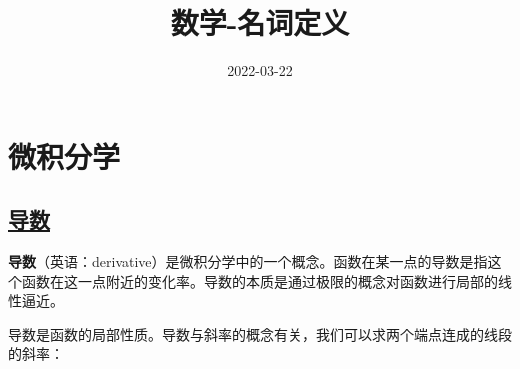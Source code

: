 

\title{数学-名词定义}
\date{2022-03-22}


\maketitle

\section{微积分学}

\subsection{\href{https://zh.wikipedia.org/wiki/\%E5\%AF\%BC\%E6\%95\%B0}{导数}}
\textbf{导数}（英语：derivative）是微积分学中的一个概念。函数在某一点的导数是指这个函数在这一点附近的变化率。导数的本质是通过极限的概念对函数进行局部的线性逼近。

导数是函数的局部性质。导数与斜率的概念有关，我们可以求两个端点连成的线段的斜率：

\begin{center}
	\begin{tikzpicture}
	\end{tikzpicture}
\end{center}


